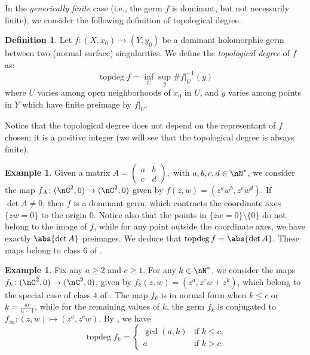 \documentclass[11 pt, twoside, a4paper]{amsart}
\newcommand{\topdeg}{\operatorname{topdeg}}
\theoremstyle{definition}
\newtheorem{defi}[thm]{Definition}
\newtheorem{ex}[thm]{Example}
\theoremstyle{definition}
\begin{document}
In the \emph{generically finite} case (i.e., the germ $f$ is dominant, but not necessarily finite), we consider the following definition of topological degree. 



\begin{defi}
Let $f \colon (X,x_0) \to (Y,y_0)$ be a dominant holomorphic germ between two (normal surface) singularities.
We define the \emph{topological degree} of $f$ as:
\[
\topdeg f = \inf_{U} \sup_y \#f|_U^{-1}(y)
\]
where $U$ varies among open neighborhoods of $x_0$ in $U$, and $y$ varies among points in $Y$ which have finite preimage by $f|_U$.
\end{defi}
Notice that the topological degree does not depend on the representant of $f$ chosen; it is a positive integer (we will see that the topological degree is always finite).

\begin{ex}
Given a matrix $A=\begin{pmatrix}
a&b\\
c&d
\end{pmatrix}
,$
with $a,b,c,d \in \nN^*$, we consider the map $f_A \colon (\nC^2,0) \to (\nC^2,0)$ given by $f(z,w)=(z^a w^b, z^c w^d)$.
If $\det A \neq 0$, then $f$ is a dominant germ, which contracts the coordinate axes $\{zw=0\}$ to the origin $0$.
Notice also that the points in $\{zw=0\} \setminus \{0\}$ do not belong to the image of $f$, while for any point outside the coordinate axes, we have exactly $\abs{\det A}$ preimages. We deduce that $\topdeg f = \abs{\det A}$. 
These maps belong to class $6$ of \cite{favre:rigidgerms}.
\end{ex}

\begin{ex}
Fix any $a \geq 2$ and $c \geq 1$.
For any $k \in \nN^*$, we consider the maps $f_k \colon (\nC^2,0) \to (\nC^2,0)$, given by $f_k(z,w)=(z^a, z^c w +z^k)$, which belong to the special case of class $4$ of \cite{favre:rigidgerms}.
The map $f_k$ is in normal form when $k \leq c$ or $k=\frac{ac}{a-1}$, while for the remaining values of $k$, the germ $f_k$ is conjugated to $f_\infty \colon (z,w) \mapsto (z^a,z^c w)$.
By \cite[Proposition 1.5]{favre:rigidgerms}, we have
\[
\topdeg f_k = \begin{cases}
\gcd(a,k) & \text{if } k \leq c\text{,}\\
a & \text{if } k > c\text{.}
\end{cases}
\]
\end{ex}
\end{document}
